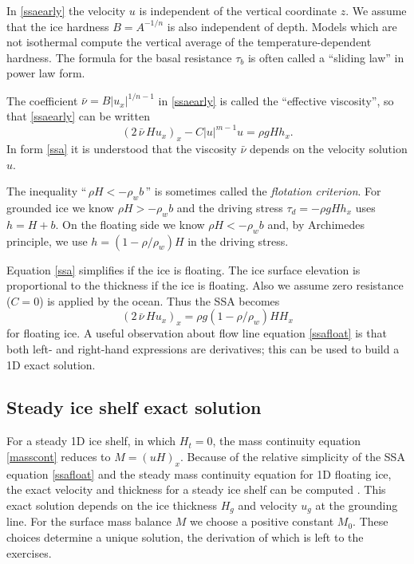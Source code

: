 \documentclass[letterpaper,final,12pt,reqno]{amsart}
\begin{document}
In \eqref{ssaearly} the velocity $u$ is independent of the vertical coordinate $z$.  We assume that the ice hardness $B=A^{-1/n}$ is also independent of depth.  Models which are not isothermal compute the vertical average of the temperature-dependent hardness.  The formula for the basal resistance $\tau_b$ is often called a ``sliding law'' in power law form.

The coefficient $\bar \nu = B |u_x|^{1/n-1}$ in \eqref{ssaearly} is called the ``effective viscosity'', so that \eqref{ssaearly} can be written
\begin{equation}
  \left(2 \,\bar \nu\, H u_x\right)_x - C |u|^{m-1} u = \rho g H h_x.  \label{ssa}
\end{equation}
In form \eqref{ssa} it is understood that the viscosity $\bar\nu$ depends on the velocity solution $u$.

The inequality ``$\,\rho H < - \rho_w b\,$'' is sometimes called the \emph{flotation criterion}.  For grounded ice we know $\rho H > - \rho_w b$ and the driving stress $\tau_d = - \rho g H h_x$ uses $h = H+b$.  On the floating side we know $\rho H < - \rho_w b$ and, by Archimedes principle, we use $h = (1-\rho/\rho_w) H$ in the driving stress.

Equation \eqref{ssa} simplifies if the ice is floating.  The ice surface elevation is proportional to the thickness if the ice is floating.  Also we assume zero resistance ($C=0$) is applied by the ocean.  Thus the SSA becomes
\begin{equation}
   \left(2 \,\bar\nu\, H u_x\right)_x = \rho g (1-\rho/\rho_w) H H_x \label{ssafloat}
\end{equation}
for floating ice.  A useful observation about flow line equation \eqref{ssafloat} is that both left- and right-hand expressions are derivatives; this can be used to build a 1D exact solution.

\subsection*{Steady ice shelf exact solution}  For a steady 1D ice shelf, in which $H_t=0$, the mass continuity equation \eqref{masscont} reduces to $M=(uH)_x$.  Because of the relative simplicity of the SSA equation \eqref{ssafloat} and the steady mass continuity equation for 1D floating ice, the exact velocity and thickness for a steady ice shelf can be computed \cite{vanderVeen83}.  This exact solution depends on the ice thickness $H_g$ and velocity $u_g$ at the grounding line.  For the surface mass balance $M$ we choose a positive constant $M_0$.  These choices determine a unique solution, the derivation of which is left to the exercises.
\end{document}
